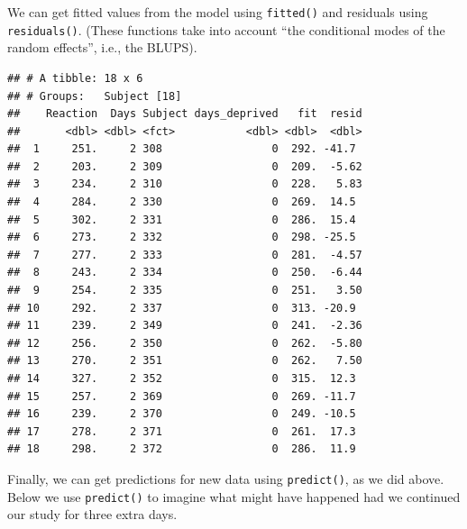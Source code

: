 \documentclass[]{book}
\newenvironment{Shaded}{\begin{snugshade}}{\end{snugshade}}
\newcommand{\DataTypeTok}[1]{\textcolor[rgb]{0.13,0.29,0.53}{#1}}
\newcommand{\DecValTok}[1]{\textcolor[rgb]{0.00,0.00,0.81}{#1}}
\newcommand{\KeywordTok}[1]{\textcolor[rgb]{0.13,0.29,0.53}{\textbf{#1}}}
\newcommand{\NormalTok}[1]{#1}
\newcommand{\OperatorTok}[1]{\textcolor[rgb]{0.81,0.36,0.00}{\textbf{#1}}}
\newcommand{\OtherTok}[1]{\textcolor[rgb]{0.56,0.35,0.01}{#1}}
\newcommand{\StringTok}[1]{\textcolor[rgb]{0.31,0.60,0.02}{#1}}
\begin{document}
We can get fitted values from the model using \texttt{fitted()} and residuals using \texttt{residuals()}. (These functions take into account ``the conditional modes of the random effects'', i.e., the BLUPS).

\begin{Shaded}
\end{Shaded}

\begin{verbatim}
## # A tibble: 18 x 6
## # Groups:   Subject [18]
##    Reaction  Days Subject days_deprived   fit  resid
##       <dbl> <dbl> <fct>           <dbl> <dbl>  <dbl>
##  1     251.     2 308                 0  292. -41.7 
##  2     203.     2 309                 0  209.  -5.62
##  3     234.     2 310                 0  228.   5.83
##  4     284.     2 330                 0  269.  14.5 
##  5     302.     2 331                 0  286.  15.4 
##  6     273.     2 332                 0  298. -25.5 
##  7     277.     2 333                 0  281.  -4.57
##  8     243.     2 334                 0  250.  -6.44
##  9     254.     2 335                 0  251.   3.50
## 10     292.     2 337                 0  313. -20.9 
## 11     239.     2 349                 0  241.  -2.36
## 12     256.     2 350                 0  262.  -5.80
## 13     270.     2 351                 0  262.   7.50
## 14     327.     2 352                 0  315.  12.3 
## 15     257.     2 369                 0  269. -11.7 
## 16     239.     2 370                 0  249. -10.5 
## 17     278.     2 371                 0  261.  17.3 
## 18     298.     2 372                 0  286.  11.9
\end{verbatim}

Finally, we can get predictions for new data using \texttt{predict()}, as we did above. Below we use \texttt{predict()} to imagine what might have happened had we continued our study for three extra days.
\end{document}
